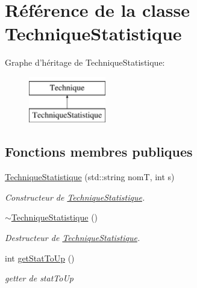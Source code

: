 \hypertarget{classTechniqueStatistique}{\section{Référence de la classe Technique\-Statistique}
\label{classTechniqueStatistique}
}
Graphe d'héritage de Technique\-Statistique\-:\begin{figure}[H]
\begin{center}
\leavevmode
\includegraphics[height=2.000000cm]{classTechniqueStatistique}
\end{center}
\end{figure}
\subsection*{Fonctions membres publiques}
\begin{DoxyCompactItemize}
\item 
\hyperlink{classTechniqueStatistique_aae9fc24bfe4041589a6db6d13139a157}{Technique\-Statistique} (std\-::string nom\-T, int s)
\begin{DoxyCompactList}\small\item\em Constructeur de \hyperlink{classTechniqueStatistique}{Technique\-Statistique}. \end{DoxyCompactList}\item 
\hypertarget{classTechniqueStatistique_a92d43e32d7ff83eb97e00388dc10efc2}{\hyperlink{classTechniqueStatistique_a92d43e32d7ff83eb97e00388dc10efc2}{$\sim$\-Technique\-Statistique} ()}\label{classTechniqueStatistique_a92d43e32d7ff83eb97e00388dc10efc2}

\begin{DoxyCompactList}\small\item\em Destructeur de \hyperlink{classTechniqueStatistique}{Technique\-Statistique}. \end{DoxyCompactList}\item 
int \hyperlink{classTechniqueStatistique_aca07b10c097c294e45c3c35d3966e7c2}{get\-Stat\-To\-Up} ()
\begin{DoxyCompactList}\small\item\em getter de stat\-To\-Up \end{DoxyCompactList}\end{DoxyCompactItemize}
